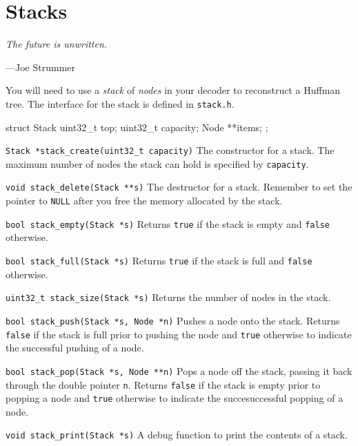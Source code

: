 \section{Stacks}
\textwidth
\epigraph{\emph{The future is unwritten.}}{---Joe Strummer}

You will need to use a \emph{stack} of \emph{nodes }in your decoder to
reconstruct a Huffman tree. The interface for the stack is defined in
\texttt{stack.h}.

\begin{clisting}{}
struct Stack {
    uint32_t top;
    uint32_t capacity;
    Node **items;
};
\end{clisting}

\begin{funcdoc}{\texttt{Stack *stack\_create(uint32\_t capacity)}}
  The constructor for a stack. The maximum number of nodes the stack can
  hold is specified by \texttt{capacity}.
\end{funcdoc}

\begin{funcdoc}{\texttt{void stack\_delete(Stack **s)}}
  The destructor for a stack. Remember to set the pointer to \texttt{NULL}
  after you free the memory allocated by the stack.
\end{funcdoc}

\begin{funcdoc}{\texttt{bool stack\_empty(Stack *s)}}
  Returns \texttt{true} if the stack is empty and \texttt{false}
  otherwise.
\end{funcdoc}

\begin{funcdoc}{\texttt{bool stack\_full(Stack *s)}}
  Returns \texttt{true} if the stack is full and \texttt{false} otherwise.
\end{funcdoc}

\begin{funcdoc}{\texttt{uint32\_t stack\_size(Stack *s)}}
  Returns the number of nodes in the stack.
\end{funcdoc}

\begin{funcdoc}{\texttt{bool stack\_push(Stack *s, Node *n)}}
  Pushes a node onto the stack. Returns \texttt{false} if the stack is
  full prior to pushing the node and \texttt{true} otherwise to indicate
  the successful pushing of a node.
\end{funcdoc}

\begin{funcdoc}{\texttt{bool stack\_pop(Stack *s, Node **n)}}
  Pops a node off the stack, passing it back through the double pointer
  \texttt{n}. Returns \texttt{false} if the stack is empty prior to
  popping a node and \texttt{true} otherwise to indicate the
  succesuccessful popping of a node.
\end{funcdoc}

\begin{funcdoc}{\texttt{void stack\_print(Stack *s)}}
  A debug function to print the contents of a stack.
\end{funcdoc}
